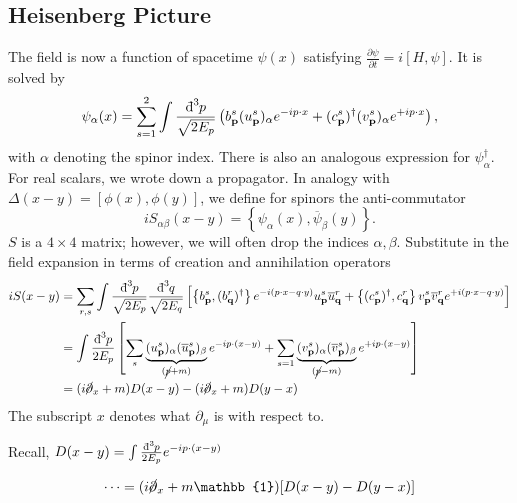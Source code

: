 \subsection*{Heisenberg Picture}%
The field is now a function of spacetime $\psi(x)$ satisfying $\frac{\partial \psi}{\partial t} = i [H, \psi]$. It is solved by
\begin{equation}
  \psi_{\alpha}(x) = \sum_{s=1}^{2} \int \frac{\bdd[3]{p}}{\sqrt{2E_{p}}} \left( b^{s}_{\vb{p}} (u^{s}_{\vb{p}})_{\alpha} e^{-ip \cdot x} + (c^{s}_{\vb{p}})^{\dagger} (v^{s}_{\vb{p}})_{\alpha} e^{+i p \cdot x} \right),
\end{equation}
with $\alpha$ denoting the spinor index.
There is also an analogous expression for $\psi^{\dagger}_{\alpha}$.
For real scalars, we wrote down a propagator. In analogy with $\Delta(x - y) = [\phi(x), \phi(y)]$, we define for spinors the anti-commutator
\begin{equation}
  i S_{\alpha\beta} (x - y) = \left\{ \psi_{\alpha}(x), \overline{\psi}_{\beta}(y) \right\}.
\end{equation}
$S$ is a $4 \times 4$ matrix; however, we will often drop the indices $\alpha, \beta$. 
Substitute in the field expansion in terms of creation and annihilation operators 
\begin{align}
  i S( x - y) &= \sum_{r, s} \int  \frac{\bdd[3]{p}}{\sqrt{2E_{p}}} \frac{\bdd[3]{q}}{\sqrt{2E_{q}}} \left[ \left\{ b^{s}_{\vb{p}}, (b^{r}_{\vb{q}})^{\dagger} \right\} e^{-i (p \cdot x - q \cdot y)} u^{s}_{\vb{p}} \overline{u}^{r}_{\vb{q}}
  + \left\{ (c_{\vb{p}}^{s})^{\dagger} , c^{r}_{\vb{q}} \right\} v^{s}_{\vb{p}} \overline{v}^{r}_{\vb{q}} e^{+i (p \cdot x - q \cdot y)} \right] \\
	      &= \int \frac{\bdd[3]{p}}{2E_{p}} \left[ \sum_{s} \underbrace{(u^{s}_{\vb{p}})_{\alpha} (\overline{u}^{s}_{\vb{p}})_{\beta}}_{\mathclap{(\cancel{p} + m)}} e^{-i p \cdot (x - y)} 
	      + \sum_{s=1} \underbrace{(v^{s}_{\vb{p}})_{\alpha} (\overline{v}^{s}_{\vb{p}})_{\beta}}_{\mathclap{(\cancel{p} - m)}} e^{+i p \cdot ( x- y)} \right] \\
	      &= (i \cancel{\partial}_x + m) D(x - y) - (i \cancel{\partial}_x + m) D(y - x)
\end{align}
The subscript $x$ denotes what $\partial_{\mu}$ is with respect to.
\begin{leftbar}
  \begin{remark}
    Recall, $D(x - y) = \int \frac{\bdd[3]{p}}{2 E_{p}} e^{-i p \cdot (x - y)}$
  \end{remark}
\end{leftbar}
\begin{equation}
  \label{eq:top}
  \dots = (i \cancel{\partial}_x + m \mathbb{1}) [D(x - y) - D(y - x)]
\end{equation}

